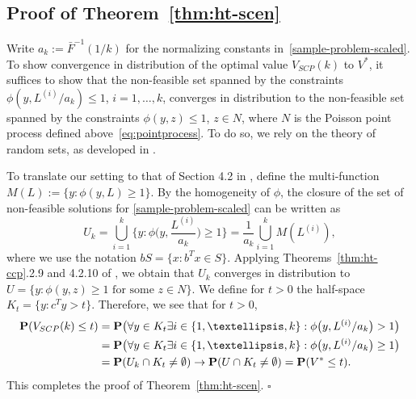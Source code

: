 \documentclass[a4paper, a4wide, 10pt, reqno]{amsart}
\theoremstyle{plain}
\renewcommand{\qed}{\hfill$\square$}
\begin{document}
\subsection{Proof of Theorem~\ref{thm:ht-scen}}\label{sec-proof6}
Write $a_k:= \bar F^{-1} (1/k)$ for the normalizing constants in~\eqref{sample-problem-scaled}. To show convergence in distribution of the optimal value $V_{SCP}(k)$ to $V^\ast$, it suffices to show that the non-feasible set spanned by the constraints $\phi(y, L^{(i)}/a_k)\le 1$, $i=1,\ldots, k$, converges in distribution to the non-feasible set spanned by the constraints $\phi(y, z)\le 1$, $z\in N$, where $N$ is the Poisson point process defined above~\eqref{eq:pointprocess}. To do so, 
we rely on the theory of random sets, as developed in \cite{Molchanov}. 

To translate our setting to that of Section 4.2 in \cite{Molchanov}, define the multi-function $M(L) := \{ y: \phi (y,L) \ge 1\}$.
By the homogeneity of $\phi$, the closure of the set of non-feasible solutions for \eqref{sample-problem-scaled}
can be written as 
\begin{equation}
    U_k = \bigcup_{i=1}^k \Big\{ y: \phi\Big(y,\frac{L^{(i)}}{a_k}\Big) \ge 1\Big\} = \frac{1}{a_k}  \bigcup_{i=1}^k M(L^{(i)}),
\end{equation} 
where we use the notation $bS = \{x: b^Tx \in S\}$. 
Applying Theorems~\ref{thm:ht-ccp}.2.9 and 4.2.10 of \cite{Molchanov}, we obtain that $U_k$ converges in distribution to $U = \{y: \phi (y,z) \ge 1 \mbox{ for some } z\in N\}$. 
We define for $t>0$ the half-space  $K_t =\{ y: c^Ty > t\}$. 
 Therefore, we see that for $t>0$,
\begin{align}
    {\bf P} (V_{SCP}(k) \leq t) &={\bf P}\big(\forall y\in K_t \exists i\in\{1,\ldots, k\}:  \phi\big(y, L^{(i)}/a_k\big)> 1\big) \\
    &={\bf P}\big(\forall y\in K_t \exists i\in\{1,\ldots, k\}:  \phi\big(y, L^{(i)}/a_k\big)\ge 1\big)\\
    &= {\bf P}(U_k \cap K_t \neq \emptyset) \rightarrow 
    {\bf P}(U \cap K_t \neq \emptyset) = {\bf P} (V^* \leq t). 
\end{align}
This completes the proof of Theorem~\ref{thm:ht-scen}. \qed
\end{document}
